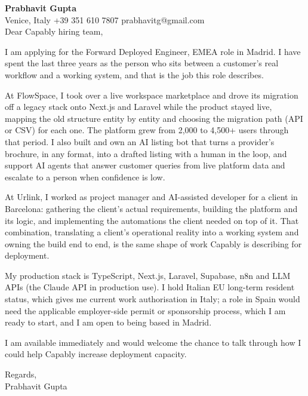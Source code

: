 \documentclass[a4paper,10.5pt]{article}
\begin{document}
\textbf{Prabhavit Gupta}\\
Venice, Italy \textbar{} +39 351 610 7807 \textbar{} prabhavitg@gmail.com\\[10pt]
Dear Capably hiring team,

I am applying for the Forward Deployed Engineer, EMEA role in Madrid. I have spent the last three years as the person who sits between a customer's real workflow and a working system, and that is the job this role describes.

At FlowSpace, I took over a live workspace marketplace and drove its migration off a legacy stack onto Next.js and Laravel while the product stayed live, mapping the old structure entity by entity and choosing the migration path (API or CSV) for each one. The platform grew from 2,000 to 4,500+ users through that period. I also built and own an AI listing bot that turns a provider's brochure, in any format, into a drafted listing with a human in the loop, and support AI agents that answer customer queries from live platform data and escalate to a person when confidence is low.

At Urlink, I worked as project manager and AI-assisted developer for a client in Barcelona: gathering the client's actual requirements, building the platform and its logic, and implementing the automations the client needed on top of it. That combination, translating a client's operational reality into a working system and owning the build end to end, is the same shape of work Capably is describing for deployment.

My production stack is TypeScript, Next.js, Laravel, Supabase, n8n and LLM APIs (the Claude API in production use). I hold Italian EU long-term resident status, which gives me current work authorisation in Italy; a role in Spain would need the applicable employer-side permit or sponsorship process, which I am ready to start, and I am open to being based in Madrid.

I am available immediately and would welcome the chance to talk through how I could help Capably increase deployment capacity.

Regards,\\
Prabhavit Gupta
\end{document}
